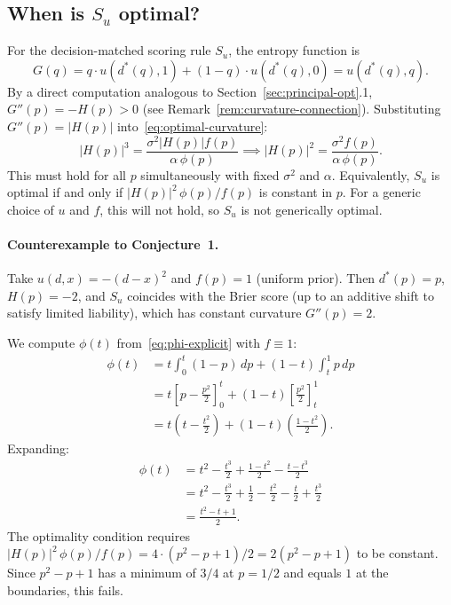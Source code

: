 \documentclass[11pt]{article}
\begin{document}
\subsection{When is $S_u$ optimal?}

For the decision-matched scoring rule $S_u$, the entropy function is
\[
G(q) = q \cdot u(d^*(q), 1) + (1-q) \cdot u(d^*(q), 0) = u(d^*(q), q).
\]
By a direct computation analogous to Section~\ref{sec:principal-opt}.1, $G''(p) = -H(p) > 0$ (see Remark~\ref{rem:curvature-connection}). Substituting $G''(p) = |H(p)|$ into~\eqref{eq:optimal-curvature}:
\[
|H(p)|^3 = \frac{\sigma^2 |H(p)| f(p)}{\alpha \,\phi(p)} \implies |H(p)|^2 = \frac{\sigma^2 f(p)}{\alpha\, \phi(p)}.
\]
This must hold for all $p$ simultaneously with fixed $\sigma^2$ and $\alpha$. Equivalently, $S_u$ is optimal if and only if $|H(p)|^2 \,\phi(p) / f(p)$ is constant in $p$. For a generic choice of $u$ and $f$, this will not hold, so $S_u$ is not generically optimal.

\paragraph{Counterexample to Conjecture~1.} Take $u(d,x) = -(d-x)^2$ and $f(p) = 1$ (uniform prior). Then $d^*(p) = p$, $H(p) = -2$, and $S_u$ coincides with the Brier score (up to an additive shift to satisfy limited liability), which has constant curvature $G''(p) = 2$.

We compute $\phi(t)$ from~\eqref{eq:phi-explicit} with $f \equiv 1$:
\begin{align*}
\phi(t) &= t\int_0^t (1-p)\,dp + (1-t)\int_t^1 p\,dp \\
&= t\left[p - \frac{p^2}{2}\right]_0^t + (1-t)\left[\frac{p^2}{2}\right]_t^1 \\
&= t\left(t - \frac{t^2}{2}\right) + (1-t)\!\left(\frac{1 - t^2}{2}\right).
\end{align*}
Expanding:
\begin{align*}
\phi(t) &= t^2 - \frac{t^3}{2} + \frac{1 - t^2}{2} - \frac{t - t^3}{2} \\
&= t^2 - \frac{t^3}{2} + \frac{1}{2} - \frac{t^2}{2} - \frac{t}{2} + \frac{t^3}{2} \\
&= \frac{t^2 - t + 1}{2}.
\end{align*}
The optimality condition requires $|H(p)|^2\,\phi(p)/f(p) = 4 \cdot (p^2 - p + 1)/2 = 2(p^2 - p + 1)$ to be constant. Since $p^2 - p + 1$ has a minimum of $3/4$ at $p = 1/2$ and equals $1$ at the boundaries, this fails.
\end{document}

